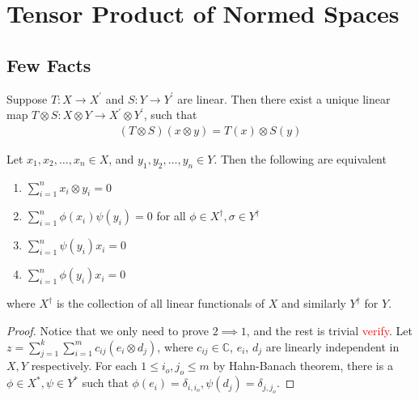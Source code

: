 

\section{Tensor Product of Normed Spaces}

\subsection{Few Facts}

Suppose $T : X \to X^\prime$ and $S: Y \to Y^\prime$ are linear. Then
there exist a unique linear map $T \otimes S : X \otimes Y \to
X^\prime \otimes Y^\prime$, such that
\begin{align*}
  (T \otimes S)(x \otimes y) = T(x) \otimes S(y)
\end{align*}

\begin{lemma}
  \label{lem:13}
  Let $x_1 , x_2 , \ldots , x_n \in X$, and $y_1 , y_2 , \ldots , y_n
  \in Y$. Then the following are equivalent
  \begin{enumerate}[label=(\arabic*)]
    \item $\sum_{i = 1}^{n} x_i \otimes y_i = 0$
    \item $\sum_{i = 1}^{n} \phi(x_i) \psi(y_i) = 0$ for all $\phi \in
      X^\dagger, \sigma \in Y^\dagger$
    \item $\sum_{i = 1}^{n} \psi(y_i) x_i = 0$
    \item $\sum_{i = 1}^{n} \phi(y_i) x_i = 0$
  \end{enumerate}
  where $X^\dagger$ is the collection of all linear functionals of
  $X$ and similarly $Y^\dagger$ for $Y$.
\end{lemma}
\begin{proof}
  Notice that we only need to prove $2 \implies 1$, and the rest is
  trivial \textcolor{red}{verify}.
  Let $z = \sum_{j = 1}^{k} \sum_{i = 1}^{m} c_{ij}(e_i \otimes
  d_j)$, where $c_{ij} \in \mathbb{C}$, $e_i$, $ d_j$ are linearly
  independent in $X, Y$ respectively. For each $1 \le i_o, j_o \le m$ by
  Hahn-Banach theorem, there is a $\phi \in X^*, \psi \in Y^*$ such
  that $\phi(e_i) = \delta_{i, i_o}, \psi(d_j) = \delta_{j, j_o}$.
\end{proof}

